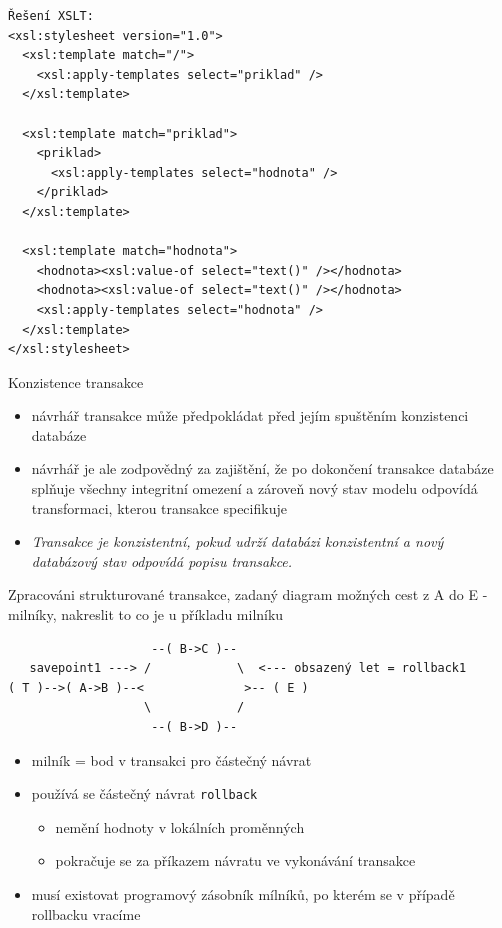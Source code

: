 \documentclass[12pt,a4paper,titlepage,final]{article}
\begin{document}
\begin{enumerate}
\begin{verbatim}
Řešení XSLT:
<xsl:stylesheet version="1.0">
  <xsl:template match="/">
    <xsl:apply-templates select="priklad" />
  </xsl:template>

  <xsl:template match="priklad">
    <priklad>
      <xsl:apply-templates select="hodnota" />
    </priklad>
  </xsl:template>

  <xsl:template match="hodnota">
    <hodnota><xsl:value-of select="text()" /></hodnota>
    <hodnota><xsl:value-of select="text()" /></hodnota>
    <xsl:apply-templates select="hodnota" />
  </xsl:template>
</xsl:stylesheet>
	\end{verbatim}
	
	{\large \item Konzistence transakce}
	\begin{itemize}
		\item návrhář transakce může předpokládat před jejím spuštěním konzistenci databáze
		\item návrhář je ale zodpovědný za zajištění, že po dokončení transakce databáze splňuje všechny integritní omezení a zároveň nový stav modelu odpovídá transformaci, kterou transakce specifikuje
		\item \emph{Transakce je konzistentní, pokud udrží databázi konzistentní a nový databázový stav odpovídá popisu transakce.}
	\end{itemize}
	
	
	{\large \item Zpracováni strukturované transakce, zadaný diagram možných cest z A do E - milníky, nakreslit to co je u příkladu milníku}
   	\begin{verbatim}
                    --( B->C )--
   savepoint1 ---> /            \  <--- obsazený let = rollback1
( T )-->( A->B )--<              >-- ( E )
                   \            /
                    --( B->D )--
   	\end{verbatim}
   	\begin{itemize}
   		\item milník = bod v transakci pro částečný návrat
   		\item používá se částečný návrat \texttt{rollback}
   		\begin{itemize}
   			\item nemění hodnoty v lokálních proměnných	
   			\item pokračuje se za příkazem návratu ve vykonávání transakce
   		\end{itemize}
   		\item musí existovat programový zásobník mílníků, po kterém se v případě rollbacku vracíme
   	\end{itemize}
   	

\end{enumerate}
\end{document}
